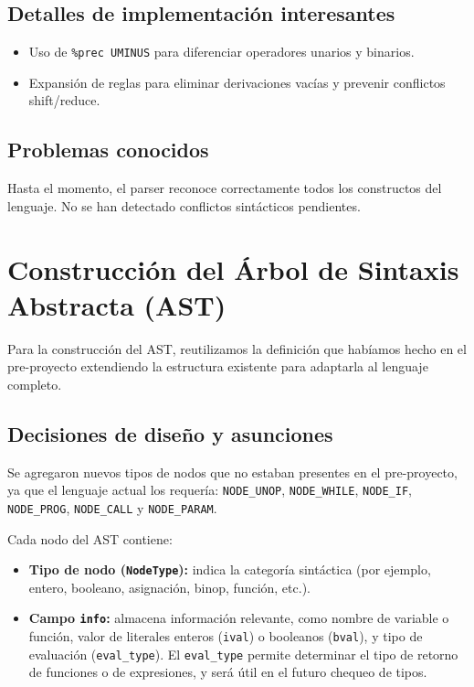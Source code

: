 \documentclass[12pt,a4paper]{article}
\begin{document}
\subsection{Detalles de implementación interesantes}
\begin{itemize}
    \item Uso de \texttt{\%prec UMINUS} para diferenciar operadores unarios y binarios.
    \item Expansión de reglas para eliminar derivaciones vacías y prevenir conflictos shift/reduce.
\end{itemize}

\subsection{Problemas conocidos}
Hasta el momento, el parser reconoce correctamente todos los constructos del lenguaje. No se han detectado conflictos sintácticos pendientes.

\section{Construcción del Árbol de Sintaxis Abstracta (AST)}

Para la construcción del AST, reutilizamos la definición que habíamos hecho en el pre-proyecto extendiendo la estructura existente para adaptarla al lenguaje completo.

\subsection{Decisiones de diseño y asunciones}
Se agregaron nuevos tipos de nodos que no estaban presentes en el pre-proyecto, ya que el lenguaje actual los requería: \texttt{NODE\_UNOP}, \texttt{NODE\_WHILE}, \texttt{NODE\_IF}, \texttt{NODE\_PROG}, \texttt{NODE\_CALL} y \texttt{NODE\_PARAM}.

Cada nodo del AST contiene:
\begin{itemize}
    \item \textbf{Tipo de nodo (\texttt{NodeType}):} indica la categoría sintáctica (por ejemplo, entero, booleano, asignación, binop, función, etc.).
    \item \textbf{Campo \texttt{info}:} almacena información relevante, como nombre de variable o función, valor de literales enteros (\texttt{ival}) o booleanos (\texttt{bval}), y tipo de evaluación (\texttt{eval\_type}).  
    El \texttt{eval\_type} permite determinar el tipo de retorno de funciones o de expresiones, y será útil en el futuro chequeo de tipos.
\end{itemize}
\end{document}
